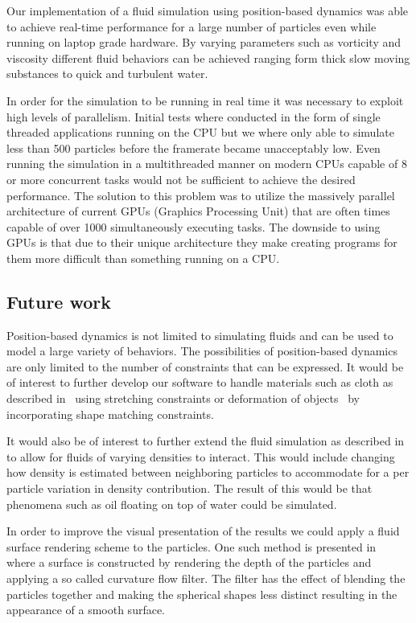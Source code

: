 Our implementation of a fluid simulation using position-based dynamics was able
to achieve real-time performance for a large number of particles even while
running on laptop grade hardware. By varying parameters such as vorticity and
viscosity different fluid behaviors can be achieved ranging form thick slow
moving substances to quick and turbulent water.

In order for the simulation to be running in real time it was necessary to
exploit high levels of parallelism. Initial tests where conducted in the form
of single threaded applications running on the CPU but we where only able to
simulate less than 500 particles before the framerate became unacceptably low.
Even running the simulation in a multithreaded manner on modern CPUs capable of
8 or more concurrent tasks would not be sufficient to achieve the desired
performance. The solution to this problem was to utilize the massively parallel
architecture of current GPUs (Graphics Processing Unit) that are often times
capable of over 1000 simultaneously executing tasks. The downside to using GPUs
is that due to their unique architecture they make creating programs for them
more difficult than something running on a CPU.

\subsection{Future work}
Position-based dynamics is not limited to simulating
fluids and can be used to model a large variety of behaviors. The possibilities
of position-based dynamics are only limited to the number of constraints that
can be expressed. It would be of interest to further develop our software to
handle materials such as cloth as described in~\cite{muller2007position} using
stretching constraints or deformation of objects~\cite{muller2005meshless} by
incorporating shape matching constraints.

It would also be of interest to further extend the fluid simulation as
described in~\cite{macklin2014unified} to allow for fluids of varying densities
to interact. This would include changing how density is estimated between
neighboring particles to accommodate for a per particle variation in density
contribution. The result of this would be that phenomena such as oil floating
on top of water could be simulated.

In order to improve the visual presentation of the results we could apply a
fluid surface rendering scheme to the particles. One such method is presented
in~\cite{van2009screen} where a surface is constructed by rendering the depth
of the particles and applying a so called curvature flow filter. The filter has
the effect of blending the particles together and making the spherical shapes
less distinct resulting in the appearance of a smooth surface.
